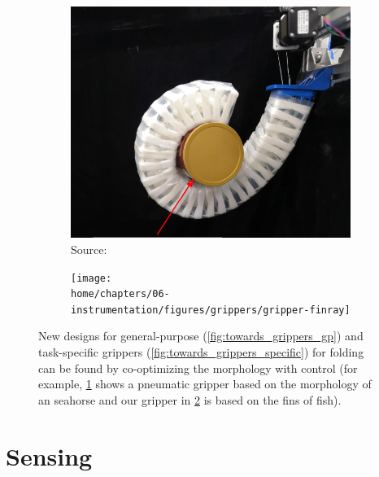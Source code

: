 \documentclass[\home/main.tex]{subfiles}
\begin{document}
\begin{figure}[htpb]{}
    \begin{subfigure}[b]{0.49\textwidth}
        \includegraphics[width=\linewidth,keepaspectratio]{figures/grippers_octopus}
        \caption{Source: \autocite{seahorsegripper}}
        \label{fig:towards_grippers_octopus}
    \end{subfigure}
    \hfill
    \begin{subfigure}[b]{0.49\textwidth}
        \texttt{[image: \\home/chapters/06-instrumentation/figures/grippers/gripper-finray]}
        \caption{}
        \label{fig:towards_gripper_fin}
    \end{subfigure}

    \caption[General-purpose and task-specific grippers for folding.]{New designs for general-purpose (\cref{fig:towards_grippers_gp}) and task-specific grippers (\cref{fig:towards_grippers_specific}) for folding can be found by co-optimizing the morphology with control (for example, \cref{fig:towards_grippers_octopus} shows a pneumatic gripper based on the morphology of an seahorse and our gripper in \cref{fig:towards_gripper_fin} is based on the fins of fish).}
    \label{fig:towards_grippers}
\end{figure}

\section{Sensing} \label{sec:towards_sensing}
\end{document}
